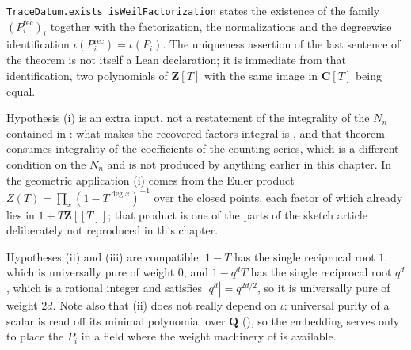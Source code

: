 \texttt{TraceDatum.exists\_isWeilFactorization} states the existence of the
family $(P_i^{\mathrm{rec}})_i$ together with the factorization, the
normalizations and the degreewise identification
$\iota(P_i^{\mathrm{rec}})=\iota(P_i)$.  The uniqueness assertion of the last
sentence of the theorem is not itself a Lean declaration; it is immediate from
that identification, two polynomials of $\mathbf Z[T]$ with the same image in
$\mathbf C[T]$ being equal.

Hypothesis (i) is an extra input, not a restatement of the integrality of
the $N_n$ contained in : what makes the recovered
factors integral is , and that theorem consumes
integrality of the coefficients of the counting series, which is a different
condition on the $N_n$ and is not produced by anything earlier in this
chapter.  In the geometric application (i) comes from the Euler product
$Z(T)=\prod_x(1-T^{\deg x})^{-1}$ over the closed points, each factor of which
already lies in $1+T\mathbf Z[[T]]$; that product is one of the parts of the
sketch article deliberately not reproduced in this chapter.

Hypotheses (ii) and (iii) are compatible: $1-T$ has the single reciprocal
root $1$, which is universally pure of weight $0$, and $1-q^dT$ has the single
reciprocal root $q^d$, which is a rational integer and satisfies
$|q^d|=q^{2d/2}$, so it is universally pure of weight $2d$.  Note also that
(ii) does not really depend on $\iota$: universal purity of a scalar is read
off its minimal polynomial over $\mathbf Q$ (),
so the embedding serves only to place the $P_i$ in a field where the weight
machinery of  is available.

